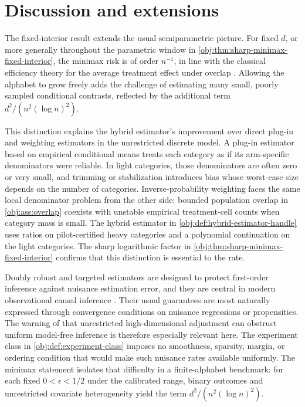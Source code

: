 \section{Discussion and extensions}

The fixed-interior result extends the usual semiparametric picture. For fixed \(d\), or more generally throughout the parametric window in \cref{obj:thm:sharp-minimax-fixed-interior}, the minimax risk is of order \(n^{-1}\), in line with the classical efficiency theory for the average treatment effect under overlap \citep{Hahn1998,HiranoImbensRidder2003}. Allowing the alphabet to grow freely adds the challenge of estimating many small, poorly sampled conditional contrasts, reflected by the additional term \(d^2/(n^2(\log n)^2)\).

This distinction explains the hybrid estimator's improvement over direct plug-in and weighting estimators in the unrestricted discrete model. A plug-in estimator based on empirical conditional means treats each category as if its arm-specific denominators were reliable. In light categories, those denominators are often zero or very small, and trimming or stabilization introduces bias whose worst-case size depends on the number of categories. Inverse-probability weighting faces the same local denominator problem from the other side: bounded population overlap in \cref{obj:ass:overlap} coexists with unstable empirical treatment-cell counts when category mass is small. The hybrid estimator in \cref{obj:def:hybrid-estimator-handle} uses ratios on pilot-certified heavy categories and a polynomial continuation on the light categories. The sharp logarithmic factor in \cref{obj:thm:sharp-minimax-fixed-interior} confirms that this distinction is essential to the rate.

Doubly robust and targeted estimators are designed to protect first-order inference against nuisance estimation error, and they are central in modern observational causal inference \citep{RobinsRotnitzkyZhao1994,BangRobins2005,VanDerLaanRubin2006}. Their usual guarantees are most naturally expressed through convergence conditions on nuisance regressions or propensities. The warning of \citet{RobinsRitov1997} that unrestricted high-dimensional adjustment can obstruct uniform model-free inference is therefore especially relevant here. The experiment class in \cref{obj:def:experiment-class} imposes no smoothness, sparsity, margin, or ordering condition that would make such nuisance rates available uniformly. The minimax statement isolates that difficulty in a finite-alphabet benchmark: for each fixed \(0<\epsilon<1/2\) under the calibrated range, binary outcomes and unrestricted covariate heterogeneity yield the term \(d^2/(n^2(\log n)^2)\).

